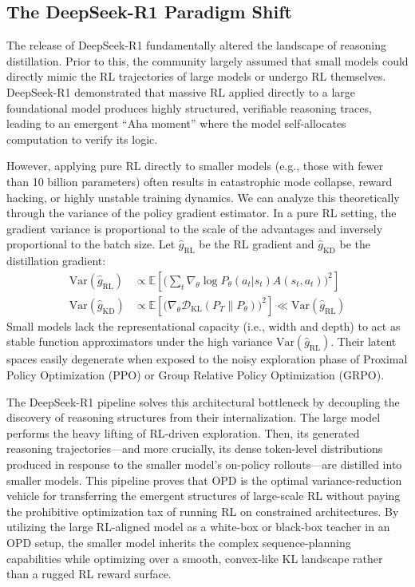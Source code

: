 \documentclass{article} %
\begin{document}
\subsection{The DeepSeek-R1 Paradigm Shift}
The release of DeepSeek-R1 \citep{2501.12948} fundamentally altered the landscape of reasoning distillation. Prior to this, the community largely assumed that small models could directly mimic the RL trajectories of large models or undergo RL themselves. DeepSeek-R1 demonstrated that massive RL applied directly to a large foundational model produces highly structured, verifiable reasoning traces, leading to an emergent ``Aha moment'' where the model self-allocates computation to verify its logic. 

However, applying pure RL directly to smaller models (e.g., those with fewer than 10 billion parameters) often results in catastrophic mode collapse, reward hacking, or highly unstable training dynamics. We can analyze this theoretically through the variance of the policy gradient estimator. In a pure RL setting, the gradient variance is proportional to the scale of the advantages and inversely proportional to the batch size. Let $\hat{g}_{\text{RL}}$ be the RL gradient and $\hat{g}_{\text{KD}}$ be the distillation gradient:
\begin{align}
\text{Var}(\hat{g}_{\text{RL}}) &\propto \mathbb{E}\left[ \Big( \sum_t \nabla_\theta \log P_\theta(a_t|s_t) A(s_t, a_t) \Big)^2 \right] \\
\text{Var}(\hat{g}_{\text{KD}}) &\propto \mathbb{E}\left[ \Big( \nabla_\theta \mathcal{D}_{\text{KL}}(P_T \parallel P_\theta) \Big)^2 \right] \ll \text{Var}(\hat{g}_{\text{RL}})
\end{align}
Small models lack the representational capacity (i.e., width and depth) to act as stable function approximators under the high variance $\text{Var}(\hat{g}_{\text{RL}})$. Their latent spaces easily degenerate when exposed to the noisy exploration phase of Proximal Policy Optimization (PPO) or Group Relative Policy Optimization (GRPO).

The DeepSeek-R1 pipeline solves this architectural bottleneck by decoupling the discovery of reasoning structures from their internalization. The large model performs the heavy lifting of RL-driven exploration. Then, its generated reasoning trajectories—and more crucially, its dense token-level distributions produced in response to the smaller model's on-policy rollouts—are distilled into smaller models. This pipeline proves that OPD is the optimal variance-reduction vehicle for transferring the emergent structures of large-scale RL without paying the prohibitive optimization tax of running RL on constrained architectures. By utilizing the large RL-aligned model as a white-box or black-box teacher in an OPD setup, the smaller model inherits the complex sequence-planning capabilities while optimizing over a smooth, convex-like KL landscape rather than a rugged RL reward surface.
\end{document}
